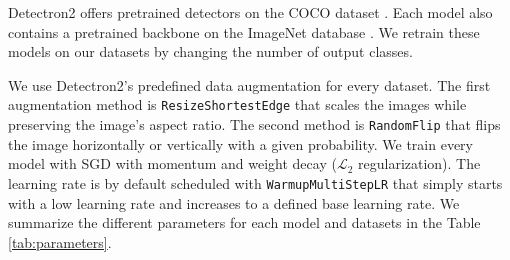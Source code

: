 Detectron2 offers pretrained detectors on the COCO dataset \cite{coco}. Each
model also contains a pretrained backbone on the ImageNet database
\cite{imagenet}. We retrain these models on our datasets by changing the number
of output classes.

We use Detectron2's predefined data augmentation for every dataset. The first
augmentation method is \texttt{ResizeShortestEdge} that scales the images while
preserving the image's aspect ratio. The second method is \texttt{RandomFlip}
that flips the image horizontally or vertically with a given probability. We
train every model with SGD with momentum and weight decay ($\mathcal{L}_2$
regularization). The learning rate is by default scheduled with
\texttt{WarmupMultiStepLR} that simply starts with a low learning rate and
increases to a defined base learning rate. We summarize the different parameters
for each model and datasets in the Table \ref{tab:parameters}.


